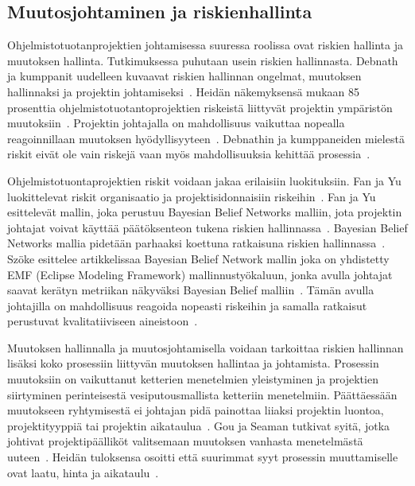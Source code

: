 \documentclass[finnish]{tktltiki2}
\theoremstyle{definition}
\theoremstyle{remark}
\begin{document}
\subsection{Muutosjohtaminen ja riskienhallinta}

Ohjelmistotuotanprojektien johtamisessa suuressa roolissa ovat riskien hallinta ja muutoksen hallinta. Tutkimuksessa puhutaan usein riskien hallinnasta. Debnath ja kumppanit uudelleen kuvaavat riskien hallinnan ongelmat, muutoksen hallinnaksi ja projektin johtamiseksi~\cite{4017705}. Heidän näkemyksensä mukaan 85 prosenttia ohjelmistotuotantoprojektien riskeistä liittyvät projektin ympäristön muutoksiin~\cite{4017705}. Projektin johtajalla on mahdollisuus vaikuttaa nopealla reagoinnillaan muutoksen hyödyllisyyteen~\cite{4017705}. Debnathin ja kumppaneiden mielestä riskit eivät ole vain riskejä vaan myös mahdollisuuksia kehittää prosessia~\cite{4017705}.

Ohjelmistotuontaprojektien riskit voidaan jakaa erilaisiin luokituksiin. Fan ja Yu luokittelevat riskit organisaatio ja projektisidonnaisiin riskeihin~\cite{fan2004bbn}. Fan ja Yu esittelevät mallin, joka perustuu Bayesian Belief Networks malliin, jota projektin johtajat voivat käyttää päätöksenteon tukena riskien hallinnassa~\cite{fan2004bbn}. Bayesian Belief Networks mallia pidetään parhaaksi koettuna ratkaisuna riskien hallinnassa~\cite{szHokeproject}. Szöke esittelee artikkelissaa Bayesian Belief Network mallin joka on yhdistetty EMF (Eclipse Modeling Framework) mallinnustyökaluun, jonka avulla johtajat saavat kerätyn metriikan näkyväksi Bayesian Belief malliin~\cite{szHokeproject}. Tämän avulla johtajilla on mahdollisuus reagoida nopeasti riskeihin ja samalla ratkaisut perustuvat kvalitatiiviseen aineistoon~\cite{szHokeproject}.

Muutoksen hallinnalla ja muutosjohtamisella voidaan tarkoittaa riskien hallinnan lisäksi koko prosessiin liittyvän muutoksen hallintaa ja johtamista. Prosessin muutoksiin on vaikuttanut ketterien menetelmien yleistyminen ja projektien siirtyminen perinteisestä vesiputousmallista ketteriin menetelmiin. Päättäessään muutokseen ryhtymisestä ei johtajan pidä painottaa liiaksi projektin luontoa, projektityyppiä tai projektin aikataulua~\cite{Chow2008961}. Gou ja Seaman tutkivat syitä, jotka johtivat projektipäälliköt valitsemaan muutoksen vanhasta menetelmästä uuteen~\cite{Guo:2008:SSP:1414004.1414046}. Heidän tuloksensa osoitti että suurimmat syyt prosessin muuttamiselle ovat laatu, hinta ja aikataulu~\cite{Guo:2008:SSP:1414004.1414046}.
\end{document}
